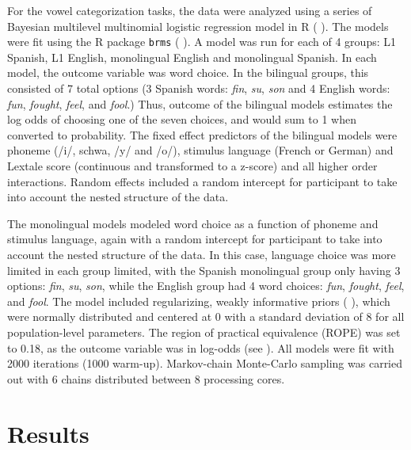 \documentclass[preprints]{Definitions/mdpi}
\begin{document}
For the vowel categorization tasks, the data were analyzed using a series of Bayesian multilevel multinomial logistic regression model in R (\citeauthor{R-base} \citeyear{R-base}).
The models were fit using the R package \texttt{brms}
(\citeauthor{R_brms_a} \citeyear{R_brms_a}).
A model was run for each of 4 groups: L1 Spanish, L1 English, monolingual English and monolingual Spanish.
In each model, the outcome variable was word choice.
In the bilingual groups, this consisted of 7 total options (3 Spanish words: \emph{fin}, \emph{su}, \emph{son} and 4 English words: \emph{fun}, \emph{fought}, \emph{feel}, and \emph{fool}.)
Thus, outcome of the bilingual models estimates the log odds of choosing one of the seven choices, and would sum to 1 when converted to probability.
The fixed effect predictors of the bilingual models were phoneme (/i/, schwa, /y/ and /o/), stimulus language (French or German) and Lextale score (continuous and transformed to a z-score) and all higher order interactions. Random effects included a random intercept for participant to take into account the nested structure of the data.

The monolingual models modeled word choice as a function of phoneme and stimulus language, again with a random intercept for participant to take into account the nested structure of the data.
In this case, language choice was more limited in each group limited, with the Spanish monolingual group only having 3 options: \emph{fin}, \emph{su}, \emph{son}, while the English group had 4 word choices: \emph{fun}, \emph{fought}, \emph{feel}, and \emph{fool}.
The model included regularizing, weakly informative priors (\citeauthor{gelman_prior_2017} \citeyear{gelman_prior_2017}),
which were normally distributed and centered at 0 with a standard deviation of 8 for all population-level parameters.
The region of practical equivalence (ROPE) was set to 0.18, as the outcome variable was in log-odds (see \citeauthor{kruschke_rejecting_2018} \citeyear{kruschke_rejecting_2018}).
All models were fit with 2000 iterations (1000 warm-up).
Markov-chain Monte-Carlo sampling was carried out with 6 chains distributed between 8 processing cores.

\hypertarget{results}{%
\section{Results}\label{results}}
\end{document}
